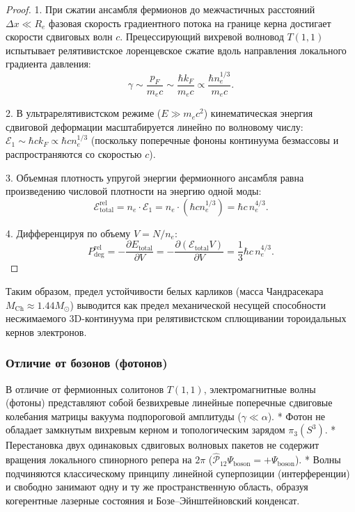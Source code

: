 \documentclass[12pt,a4paper]{article}
\begin{document}
	\begin{proof}
		1. При сжатии ансамбля фермионов до межчастичных расстояний $\Delta x \ll R_e$ фазовая скорость градиентного потока на границе керна достигает скорости сдвиговых волн $c$. Прецессирующий вихревой волновод $T(1,1)$ испытывает релятивистское лоренцевское сжатие вдоль направления локального градиента давления:
		\begin{equation}
			\gamma \sim \frac{p_F}{m_e c} \sim \frac{\hbar k_F}{m_e c} \propto \frac{\hbar n_e^{1/3}}{m_e c}.
		\end{equation}
		
		2. В ультрарелятивистском режиме ($E \gg m_e c^2$) кинематическая энергия сдвиговой деформации масштабируется линейно по волновому числу: $\mathcal{E}_1 \sim \hbar c k_F \propto \hbar c n_e^{1/3}$ (поскольку поперечные фононы континуума безмассовы и распространяются со скоростью $c$).
		
		3. Объемная плотность упругой энергии фермионного ансамбля равна произведению числовой плотности на энергию одной моды:
		\begin{equation}
			\mathcal{E}_{\text{total}}^{\text{rel}} = n_e \cdot \mathcal{E}_1 = n_e \cdot \left( \hbar c n_e^{1/3} \right) = \hbar c \, n_e^{4/3}.
		\end{equation}
		
		4. Дифференцируя по объему $V = N / n_e$:
		\begin{equation}
			P_{\text{deg}}^{\text{rel}} = -\frac{\partial E_{\text{total}}}{\partial V} = -\frac{\partial (\mathcal{E}_{\text{total}} V)}{\partial V} = \frac{1}{3} \hbar c \, n_e^{4/3}.
		\end{equation}
	\end{proof}
	Таким образом, предел устойчивости белых карликов (масса Чандрасекара $M_{\text{Ch}} \approx 1.44 M_\odot$) выводится как предел механической несущей способности несжимаемого 3D-континуума при релятивистском сплющивании тороидальных кернов электронов.
	
	\subsubsection{Отличие от бозонов (фотонов)}
	В отличие от фермионных солитонов $T(1,1)$, электромагнитные волны (фотоны) представляют собой безвихревые линейные поперечные сдвиговые колебания матрицы вакуума подпороговой амплитуды ($\gamma \ll \alpha$). 
	* Фотон не обладает замкнутым вихревым керном и топологическим зарядом $\pi_3(S^3)$.
	* Перестановка двух одинаковых сдвиговых волновых пакетов не содержит вращения локального спинорного репера на $2\pi$ ($\hat{\mathcal{P}}_{12} \Psi_{\text{boson}} = +\Psi_{\text{boson}}$).
	* Волны подчиняются классическому принципу линейной суперпозиции (интерференции) и свободно занимают одну и ту же пространственную область, образуя когерентные лазерные состояния и Бозе--Эйнштейновский конденсат.
	
\end{document}
